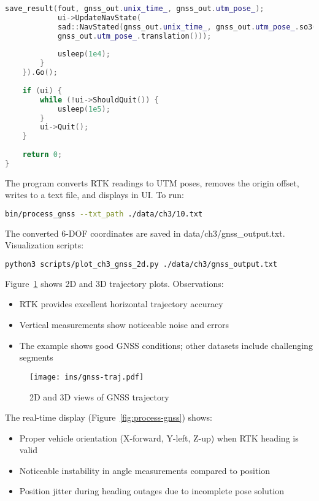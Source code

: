\begin{lstlisting}[language=c++,caption=ch3/process\_gnss.cc]
			save_result(fout, gnss_out.unix_time_, gnss_out.utm_pose_);
			ui->UpdateNavState(
			sad::NavStated(gnss_out.unix_time_, gnss_out.utm_pose_.so3(), 
			gnss_out.utm_pose_.translation()));
			
			usleep(1e4);
		}
	}).Go();
	
	if (ui) {
		while (!ui->ShouldQuit()) {
			usleep(1e5);
		}
		ui->Quit();
	}
	
	return 0;
}
\end{lstlisting}

The program converts RTK readings to UTM poses, removes the origin offset, writes to a text file, and displays in UI. To run:

\begin{lstlisting}[language=sh, caption=Terminal command:]
bin/process_gnss --txt_path ./data/ch3/10.txt
\end{lstlisting}

The converted 6-DOF coordinates are saved in data/ch3/gnss_output.txt. Visualization scripts:

\begin{lstlisting}[language=sh, caption=Terminal command:]
python3 scripts/plot_ch3_gnss_2d.py ./data/ch3/gnss_output.txt 
\end{lstlisting}

Figure~\ref{fig:gnss-traj} shows 2D and 3D trajectory plots. Observations:
\begin{itemize}
	\item RTK provides excellent horizontal trajectory accuracy
	\item Vertical measurements show noticeable noise and errors
	\item The example shows good GNSS conditions; other datasets include challenging segments
\end{itemize}

\begin{figure}
	\centering
	\texttt{[image: ins/gnss-traj.pdf]}
	\caption{2D and 3D views of GNSS trajectory}
	\label{fig:gnss-traj}
\end{figure}

The real-time display (Figure~\ref{fig:process-gnss}) shows:
\begin{itemize}
	\item Proper vehicle orientation (X-forward, Y-left, Z-up) when RTK heading is valid
	\item Noticeable instability in angle measurements compared to position
	\item Position jitter during heading outages due to incomplete pose solution
\end{itemize}

